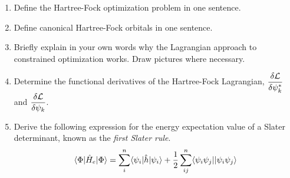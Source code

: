 \documentclass[11pt]{article}
\numberwithin{equation}{section}
\begin{document}
\begin{enumerate}
\item
  Define the Hartree-Fock optimization problem in one sentence.
\item
  Define canonical Hartree-Fock orbitals in one sentence.
\item
  Briefly explain in your own words why the Lagrangian approach to constrained optimization works.
  Draw pictures where necessary.
\item
  Determine the functional derivatives of the Hartree-Fock Lagrangian,
  $\dfrac{\delta \mathcal{L}}{\delta \psi _k^*}$
  and
  $\dfrac{\delta \mathcal{L}}{\delta \psi _k}$.
\item
  Derive the following expression for the energy expectation value of a Slater determinant, known as the \textit{first Slater rule}.
\begin{align*}
  \langle\Phi |\hat{H}_e|\Phi \rangle
=
\sum_{i}^n
  \langle\psi _i|\hat{h}|\psi _i\rangle
+\frac {1}{2}\sum_{ij}^n
  \langle\psi _i\psi _j||\psi _i\psi _j\rangle
\end{align*}
\end{enumerate}
\end{document}
